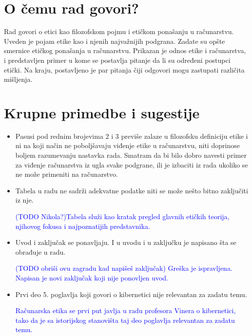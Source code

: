 \documentclass[a4paper]{report}
\newcommand{\odgovor}[1]{\textcolor{blue}{#1}}
\begin{document}
\section{O čemu rad govori?}

Rad govori o etici kao filozofskom pojmu i etičkom ponašanju u računarstvu. Uveden je pojam etike kao i njenih najvažnijih podgrana. Zadate su opšte smernice etičkog ponašanja u računarstvu. Prikazan je odnos etike i računarstva, i predstavljen primer u kome se postavlja pitanje da li su određeni postupci etički. Na kraju, postavljeno je par pitanja čiji odgovori mogu zastupati različita mišljenja.


\section{Krupne primedbe i sugestije}
\begin{itemize}
    \item Pasusi pod rednim brojevima 2 i 3 previše zalaze u filozofsku definiciju etike i ni na koji način ne poboljšavaju viđenje etike u računarstvu, niti doprinose boljem razumevanju nastavka rada. Smatram da bi bilo dobro navesti primer za viđenje računarstva iz ugla svake podgrane, ili je izbaciti iz rada ukoliko se ne može primeniti na računarstvo.
    \item Tabela u radu ne sadrži adekvatne podatke niti se može nešto bitno zaključiti iz nje.

\odgovor{(TODO Nikola?)Tabela služi kao kratak pregled glavnih etičkih teorija, njihovog fokusa i najpoznatijih predstavnika.}

    \item Uvod i zaključak se ponavljaju. I u uvodu i u zaključku je napisano šta se obrađuje u radu.
    
    \odgovor{(TODO obriši ovu zagradu kad napišeš zaključak) Greška je ispravljena. Napisan je novi zaključak koji nije ponovljen uvod.}
    
    \item Prvi deo 5. poglavlja koji govori o kibernetici nije relevantan za zadatu temu.
    
    \odgovor{Računarska etika se prvi put javlja u radu profesora Vinera o kibernetici, tako da je sa istorijskog stanovišta taj deo poglavlja relevantan za zadatu temu.}

\end{itemize}
\end{document}
